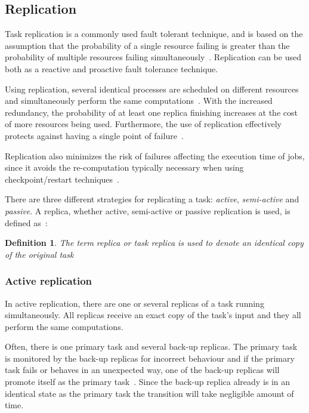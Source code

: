 \documentclass{cslthse-msc}
\newtheorem{definition}{Definition}[chapter]
\begin{document}
\subsection{Replication} \label{subsec:background_replication}
Task replication is a commonly used fault tolerant technique, and is based on the assumption that the probability of a single resource failing is greater than the probability of multiple resources failing simultaneously~\cite{faultToleranceGrid}. Replication can be used both as a reactive and proactive fault tolerance technique. %

Using replication, several identical processes are scheduled on different resources and simultaneously perform the same computations~\cite{relGridSystems}. With the increased redundancy, the probability of at least one replica finishing increases at the cost of more resources being used. Furthermore, the use of replication effectively protects against having a single point of failure~\cite{faultToleranceGrid}.

Replication also minimizes the risk of failures affecting the execution time of jobs, since it avoids the re-computation typically necessary when using checkpoint/restart techniques~\cite{designFaultTolerantSched}.

There are three different strategies for replicating a task: \emph{active}, \emph{semi-active} and \emph{passive}. A replica, whether active, semi-active or passive replication is used, is defined as~\cite{effTaskReplMobGrid}:
\begin{definition} \label{def:replica}
The term replica or task replica is used to denote an identical copy of the original task
\end{definition}

\subsubsection{Active replication} \label{subsec:active_replication}
In active replication, there are one or several replicas of a task running simultaneously. All replicas receive an exact copy of the task's input and they all perform the same computations. 

Often, there is one primary task and several back-up replicas. The primary task is monitored by the back-up replicas for incorrect behaviour and if the primary task fails or behaves in an unexpected way, one of the back-up replicas will promote itself as the primary task~\cite{surveyFaultParallel}. Since the back-up replica already is in an identical state as the primary task the transition will take negligible amount of time. 
\end{document}
